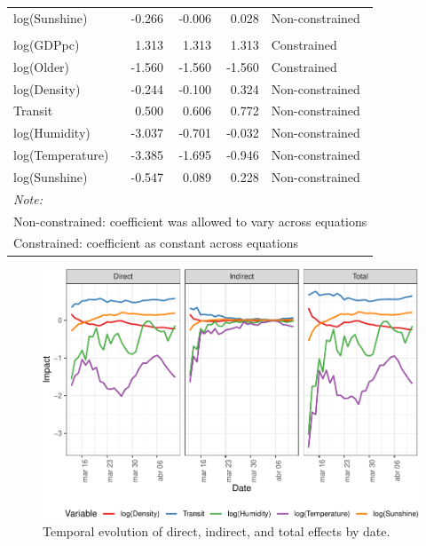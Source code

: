 \documentclass[]{elsarticle} %
\makeatletter
\def\maxwidth{\ifdim\Gin@nat@width>\linewidth\linewidth
\else\Gin@nat@width\fi}
\let\Oldincludegraphics\includegraphics
\renewcommand{\includegraphics}[1]{\Oldincludegraphics[width=\maxwidth]{#1}}
\makeatother
\begin{document}
\begin{table}
\begin{tabular}[t]{lrrrl}
\hspace{1em}log(Sunshine) & -0.266 & -0.006 & 0.028 & Non-constrained\\
\rowcolor{gray!6}  \addlinespace[0.3em]
\multicolumn{5}{l}{\textbf{Total Effects}}\\
\hspace{1em}log(GDPpc) & 1.313 & 1.313 & 1.313 & Constrained\\
\hspace{1em}log(Older) & -1.560 & -1.560 & -1.560 & Constrained\\
\rowcolor{gray!6}  \hspace{1em}log(Density) & -0.244 & -0.100 & 0.324 & Non-constrained\\
\hspace{1em}Transit & 0.500 & 0.606 & 0.772 & Non-constrained\\
\rowcolor{gray!6}  \hspace{1em}log(Humidity) & -3.037 & -0.701 & -0.032 & Non-constrained\\
\hspace{1em}log(Temperature) & -3.385 & -1.695 & -0.946 & Non-constrained\\
\rowcolor{gray!6}  \hspace{1em}log(Sunshine) & -0.547 & 0.089 & 0.228 & Non-constrained\\
\bottomrule
\multicolumn{5}{l}{\textit{Note: }}\\
\multicolumn{5}{l}{Non-constrained: coefficient was allowed to vary across equations}\\
\multicolumn{5}{l}{Constrained: coefficient as constant across equations}\\
\end{tabular}
\end{table}

\begin{figure}
\centering
\includegraphics{Environmental-Correlates-of-COVID19-Spain_files/figure-latex/plot-impacts-1.pdf}
\caption{\label{fig:plot-impacts}Temporal evolution of direct, indirect,
and total effects by date.}
\end{figure}
\end{document}
